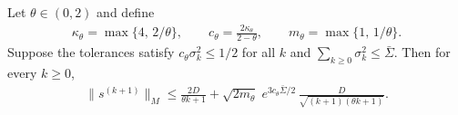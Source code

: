 \begin{theorem}\label{thm:acc-inexact}
    Let $\theta \in (0,2)$ and define
    \begin{align}
        \kappa_\theta = \max\{4,\, 2/\theta\}, \qquad
        c_\theta = \frac{2\kappa_\theta}{2-\theta}, \qquad
        m_\theta = \max\{1,\, 1/\theta\}.
    \end{align}
    Suppose the tolerances satisfy $c_\theta\sigma_k^2 \le 1/2$ for all $k$ and $\sum_{k\ge 0}\sigma_k^2 \le \bar\Sigma$.
    Then for every $k \ge 0$,
    \begin{align}
        \|s^{(k+1)}\|_M \le \frac{2D}{\theta k + 1} + \sqrt{2 m_\theta}\; e^{3 c_\theta\bar\Sigma/2}\, \frac{D}{\sqrt{(k+1)(\theta k + 1)}}. \label{eq:acc-inexact-rate}
    \end{align}
\end{theorem}
